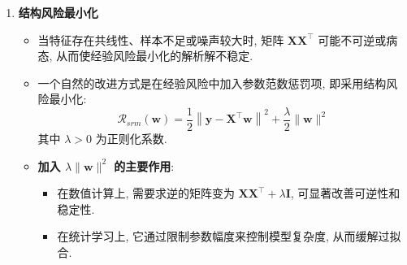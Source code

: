 \documentclass{../nndlcourse}
\begin{document}
\begin{enumerate}
\begin{itemize}
    \item \textbf{解析解的推导要点}:
        \begin{itemize}
      \item 对目标函数求梯度可得
            \begin{equation*}
        \frac{\partial \mathcal{R}(\boldsymbol{w})}{\partial \boldsymbol{w}} = -\boldsymbol{X}\left(\boldsymbol{y} - \boldsymbol{X}^{\top} \boldsymbol{w}\right) = \boldsymbol{X}\boldsymbol{X}^{\top} \boldsymbol{w} - \boldsymbol{X}\boldsymbol{y}.
            \end{equation*}
      \item 令梯度为零, 可得正规方程
            \begin{equation*}
        \boldsymbol{X}\boldsymbol{X}^{\top} \boldsymbol{w} = \boldsymbol{X}\boldsymbol{y}.
            \end{equation*}
      \item 当 $\boldsymbol{X}\boldsymbol{X}^{\top}$ 可逆时, 经验风险最小化的解析解为
            \begin{equation*}
        \boldsymbol{w}^* = \left(\boldsymbol{X}\boldsymbol{X}^{\top}\right)^{-1} \boldsymbol{X}\boldsymbol{y}.
            \end{equation*}
      \item 上式说明: 在线性回归中, 最小二乘解本质上就是平方损失下的经验风险最小化解.
        \end{itemize}
    \end{itemize}

    \item \textbf{结构风险最小化}
    \begin{itemize}
    \item 当特征存在共线性、样本不足或噪声较大时, 矩阵 $\boldsymbol{X}\boldsymbol{X}^{\top}$ 可能不可逆或病态, 从而使经验风险最小化的解析解不稳定.
    \item 一个自然的改进方式是在经验风险中加入参数范数惩罚项, 即采用结构风险最小化:
        \begin{equation*}
        \mathcal{R}_{srm}(\boldsymbol{w}) = \frac{1}{2}\left\|\boldsymbol{y}-\boldsymbol{X}^{\top} \boldsymbol{w}\right\|^2 + \frac{\lambda}{2}\|\boldsymbol{w}\|^2
        \end{equation*}
    其中 $\lambda > 0$ 为正则化系数.

    \item \textbf{加入 $\lambda \|\boldsymbol{w}\|^2$ 的主要作用}:
        \begin{itemize}
      \item 在数值计算上, 需要求逆的矩阵变为 $\boldsymbol{X}\boldsymbol{X}^{\top} + \lambda \boldsymbol{I}$, 可显著改善可逆性和稳定性.
      \item 在统计学习上, 它通过限制参数幅度来控制模型复杂度, 从而缓解过拟合.
        \end{itemize}


\end{itemize}
\end{enumerate}
\end{document}
